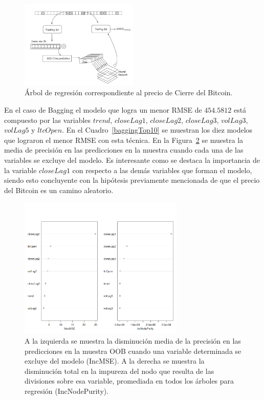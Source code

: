 \documentclass[a4paper,12pt,twocolumn]{article}
\begin{document}
\begin{figure}[!hbt]
\centering
\includegraphics[width=0.5\textwidth]{diagramNeuralNetwork}
\caption{Árbol de regresión correspondiente al precio de Cierre del Bitcoin.}
\label{decisionTree}
\end{figure}

En el caso de Bagging el modelo que logra un menor RMSE de $454.5812$ está compuesto por las variables $trend$, $closeLag1$, $closeLag2$, $closeLag3$, $volLag3$, $volLag5$ y $ltcOpen$. En el Cuadro~\ref{baggingTop10} se muestran los diez modelos que lograron el menor RMSE con esta técnica. En la Figura~\ref{baggingVariableImportancia}  se muestra la media de precisión en las predicciones en la muestra cuando cada una de las variables se excluye del modelo. Es interesante como se destaca la importancia de la variable $closeLag1$ con respecto a las demás variables que forman el modelo, siendo esto concluyente con la hipótesis previamente mencionada de que el precio del Bitcoin es un camino aleatorio. 


\begin{figure}[!hbt]
\centering
\includegraphics[width=0.7\textwidth]{baggingVariableImportancia}
\caption{A la izquierda se muestra la disminución media de la precisión en las predicciones en la muestra OOB cuando una variable determinada se excluye del modelo (IncMSE). A la derecha se muestra la disminución total en la impureza del nodo que resulta de las divisiones sobre esa variable, promediada en todos los árboles para regresión (IncNodePurity).}
\label{baggingVariableImportancia}
\end{figure}
\end{document}
